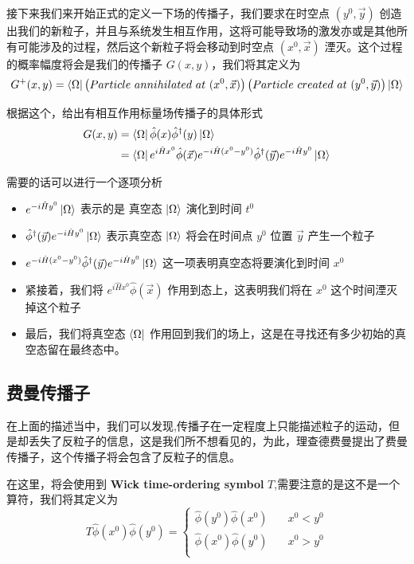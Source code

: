 \documentclass{article}
\begin{document}
接下来我们来开始正式的定义一下场的传播子，我们要求在时空点 $(y^0,\vec{y})$ 创造出我们的新粒子，并且与系统发生相互作用，这将可能导致场的激发亦或是其他所有可能涉及的过程，然后这个新粒子将会移动到时空点 $(x^0,\vec{x})$ 湮灭。这个过程的概率幅度将会是我们的传播子 $G(x,y)$，我们将其定义为 
\begin{equation*}
    G^{+}(x,y) = \bra{\Omega}\left( Particle\ annihilated\ at\ (x^0,\vec{x})\right)\left(Particle\ created\ at\ (y^0,\vec{y})\right)\ket{\Omega}
\end{equation*}

根据这个，给出有相互作用标量场传播子的具体形式
\begin{align*}
    G(x,y) &= \bra{\Omega}\hat{\phi}(x)\hat{\phi}^\dagger(y)\ket{\Omega} \\
    &= \bra{\Omega}e^{i\hat{H}x^0}\hat{\phi}(\vec{x})e^{-i\hat{H}(x^0 - y^0)}\hat{\phi}^\dagger(\vec{y})e^{-i\hat{H}y^0}\ket{\Omega} 
\end{align*}

需要的话可以进行一个逐项分析
\begin{itemize}
    \item $e^{-i\hat{H}y^0}\ket{\Omega}$ 表示的是 真空态 $\ket{\Omega}$ 演化到时间 $t^0$
    \item $\hat{\phi}^\dagger(\vec{y})e^{-i\hat{H}y^0}\ket{\Omega}$ 表示真空态 $\ket{\Omega}$ 将会在时间点 $y^0$ 位置 $\vec{y}$ 产生一个粒子
    \item $e^{-i\hat{H}(x^0 - y^0)}\hat{\phi}^\dagger(\vec{y})e^{-i\hat{H}y^0}\ket{\Omega}$ 这一项表明真空态将要演化到时间 $x^0$
    \item 紧接着，我们将 $e^{i\hat{H}x^0}\hat{\phi}(\vec{x})$ 作用到态上，这表明我们将在 $x^0$ 这个时间湮灭掉这个粒子
    \item 最后，我们将真空态 $\bra{\Omega}$ 作用回到我们的场上，这是在寻找还有多少初始的真空态留在最终态中。
\end{itemize}

\subsection{费曼传播子}
在上面的描述当中，我们可以发现,传播子在一定程度上只能描述粒子的运动，但是却丢失了反粒子的信息，这是我们所不想看见的，为此，理查德费曼提出了费曼传播子，这个传播子将会包含了反粒子的信息。

在这里，将会使用到 \textbf{Wick time-ordering symbol} $T$,需要注意的是这不是一个算符，我们将其定义为
\begin{equation*}
    T\hat{\phi}(x^0)\hat{\phi}(y^0) =
    \begin{cases}
        \hat{\phi}(y^0)\hat{\phi}(x^0) &\quad x^0 < y^0 \\
        \hat{\phi}(x^0)\hat{\phi}(y^0) &\quad x^0 > y^0 \\
    \end{cases}
\end{equation*}
\end{document}
